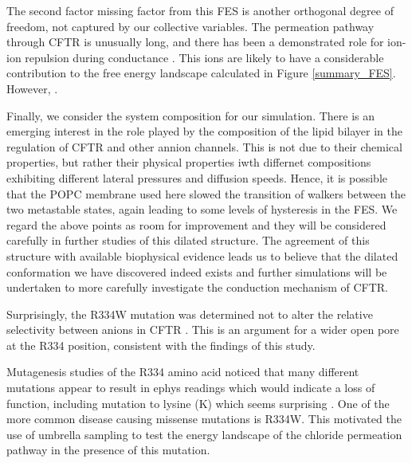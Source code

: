 The second factor missing factor from this FES is another orthogonal degree of freedom, not captured by our collective variables. The permeation pathway through CFTR is unusually long, and there has been a demonstrated role for ion-ion repulsion during conductance \cite{gong2004, gong2003, gong2003a, tabcharani1993, zhou2002}. This ions are likely to have a considerable contribution to the free energy landscape calculated in Figure \ref{summary_FES}. However, .

Finally, we consider the system composition for our simulation. There is an emerging interest in the role played by the composition of the lipid bilayer in the regulation of CFTR and other annion channels. This is not due to their chemical properties, but rather their physical properties iwth differnet compositions exhibiting different lateral pressures and diffusion speeds. Hence, it is possible that the POPC membrane used here slowed the transition of walkers between the two metastable states, again leading to some levels of hysteresis in the FES. We regard the above points as room for improvement and they will be considered carefully in further studies of this dilated structure. The agreement of this structure with available biophysical evidence leads us to believe that the dilated conformation we have discovered indeed exists and further simulations will be undertaken to more carefully investigate the conduction mechanism of CFTR. 

Surprisingly, the R334W mutation was determined not to alter the relative selectivity between anions in CFTR \cite{sheppard1993}. This is an argument for a wider open pore at the R334 position, consistent with the findings of this study.

Mutagenesis studies of the R334 amino acid noticed that many different mutations appear to result in ephys readings which would indicate a loss of function, including mutation to lysine (K) which seems surprising \cite{ge2004, gong2004, linsdell2021}. One of the more common disease causing missense mutations is R334W. This motivated the use of umbrella sampling to test the energy landscape of the chloride permeation pathway in the presence of this mutation. 

